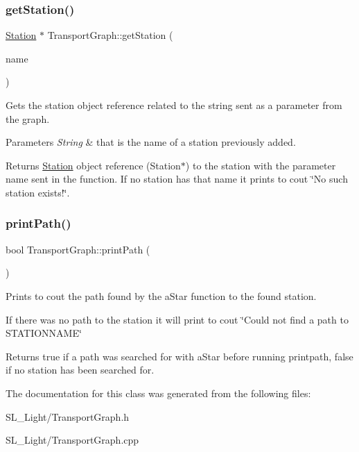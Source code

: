\subsubsection{\texorpdfstring{getStation()}{getStation()}}
{\footnotesize\ttfamily \mbox{\hyperlink{class_station}{Station}} $\ast$ Transport\+Graph\+::get\+Station (\begin{DoxyParamCaption}\item[{std\+::string}]{name }\end{DoxyParamCaption})}

Gets the station object reference related to the string sent as a parameter from the graph.


\begin{DoxyParams}{Parameters}
{\em String} & that is the name of a station previously added.\\
\hline
\end{DoxyParams}
\begin{DoxyReturn}{Returns}
\mbox{\hyperlink{class_station}{Station}} object reference (Station$\ast$) to the station with the parameter name sent in the function. If no station has that name it prints to cout \char`\"{}\+No such station exists!\char`\"{}. 
\end{DoxyReturn}
\mbox{\label{class_transport_graph_adcd1d4c8068b5b524cbd323061caf068}} 
\subsubsection{\texorpdfstring{printPath()}{printPath()}}
{\footnotesize\ttfamily bool Transport\+Graph\+::print\+Path (\begin{DoxyParamCaption}{ }\end{DoxyParamCaption})}

Prints to cout the path found by the a\+Star function to the found station. 

If there was no path to the station it will print to cout \char`\"{}\+Could not find a path to S\+T\+A\+T\+I\+O\+N\+N\+A\+M\+E\char`\"{}

\begin{DoxyReturn}{Returns}
true if a path was searched for with a\+Star before running printpath, false if no station has been searched for. 
\end{DoxyReturn}


The documentation for this class was generated from the following files\+:\begin{DoxyCompactItemize}
\item 
S\+L\+\_\+\+Light/Transport\+Graph.\+h\item 
S\+L\+\_\+\+Light/Transport\+Graph.\+cpp\end{DoxyCompactItemize}
